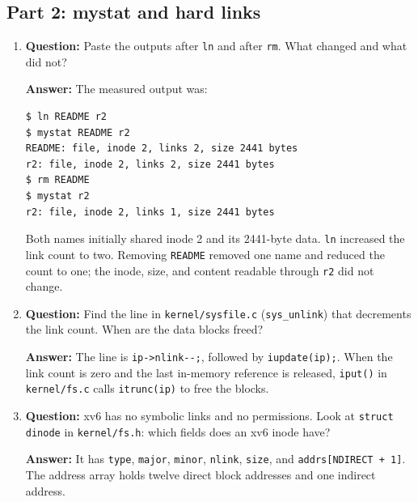 \documentclass[12pt]{article}
\begin{document}
\subsection{Part 2: mystat and hard links}
\begin{enumerate}
\item \textbf{Question:} Paste the outputs after \texttt{ln} and after \texttt{rm}. What changed and what did not?
\par\textbf{Answer:} The measured output was:
\begin{lstlisting}
$ ln README r2
$ mystat README r2
README: file, inode 2, links 2, size 2441 bytes
r2: file, inode 2, links 2, size 2441 bytes
$ rm README
$ mystat r2
r2: file, inode 2, links 1, size 2441 bytes
\end{lstlisting}
Both names initially shared inode 2 and its 2441-byte data. \texttt{ln} increased the link count to two. Removing \texttt{README} removed one name and reduced the count to one; the inode, size, and content readable through \texttt{r2} did not change.

\item \textbf{Question:} Find the line in \texttt{kernel/sysfile.c} (\texttt{sys\_unlink}) that decrements the link count. When are the data blocks freed?
\par\textbf{Answer:} The line is \lstinline!ip->nlink--;!, followed by \texttt{iupdate(ip);}. When the link count is zero and the last in-memory reference is released, \texttt{iput()} in \texttt{kernel/fs.c} calls \texttt{itrunc(ip)} to free the blocks.

\item \textbf{Question:} xv6 has no symbolic links and no permissions. Look at \texttt{struct dinode} in \texttt{kernel/fs.h}: which fields does an xv6 inode have?
\par\textbf{Answer:} It has \texttt{type}, \texttt{major}, \texttt{minor}, \texttt{nlink}, \texttt{size}, and \texttt{addrs[NDIRECT + 1]}. The address array holds twelve direct block addresses and one indirect address.
\end{enumerate}
\end{document}
